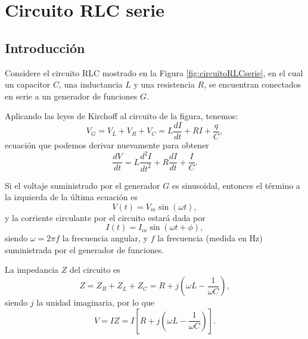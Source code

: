\documentclass[laboratorio]{guia}
\begin{document}
 
\maketitle

\section{Circuito RLC serie}

\subsection{Introducci\'on}

Considere el circuito RLC mostrado en la Figura \ref{fig:circuitoRLCserie}, en el
cual un capacitor $C$, una inductancia $L$ y una resistencia
$R$, se encuentran conectados en serie a un generador
de funciones $G$.

Aplicando las leyes de Kirchoff al circuito de la figura, 
tenemos:
\begin{equation}
    V_G = V_L + V_R + V_C = L \frac{dI}{dt} + RI + \frac{q}{C},
\end{equation}
ecuaci\'on que podemos derivar nuevamente para obtener
\begin{equation}
    \frac{dV}{dt} = L \frac{d^2I}{dt^2} + R \frac{dI}{dt} + \frac{I}{C}.
\end{equation}

Si el voltaje suministrado por el generador $G$ es sinusoidal, entonces el 
t\'ermino a la izquierda de la \'ultima ecuaci\'on es
\begin{equation}
    V(t) = V_m \sin \left( \omega t \right),
\end{equation}
y la corriente circulante por el circuito estar\'a dada por
\begin{equation}
    I(t) = I_m \sin \left( \omega t + \phi \right),
\end{equation}
siendo $\omega = 2\pi f$ la frecuencia angular, y $f$ la frecuencia 
(medida en Hz) suministrada por el generador de funciones. 

La impedancia $Z$ del circuito es 
\begin{equation}
    Z = Z_R + Z_L + Z_C = R + j \left( \omega L - \frac{1}{\omega C} \right),
\end{equation}
siendo $j$ la unidad imaginaria, por lo que
\begin{equation}
    V = IZ = I \left[ R + j \left( \omega L - \frac{1}{\omega C} \right) \right].
\end{equation}
\end{document}
